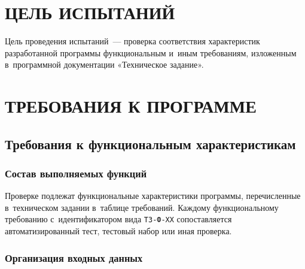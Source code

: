 \documentclass[12pt,a4paper]{extarticle}
\begin{document}
\clearpage

\section{ЦЕЛЬ ИСПЫТАНИЙ}

Цель проведения испытаний~--- проверка соответствия характеристик разработанной программы функциональным и~иным требованиям, изложенным в~программной документации «Техническое задание».

\clearpage

\section{ТРЕБОВАНИЯ К ПРОГРАММЕ}

\subsection{Требования к функциональным характеристикам}

\subsubsection{Состав выполняемых функций}


Проверке подлежат функциональные характеристики программы, перечисленные в~техническом задании в~таблице требований. Каждому функциональному требованию с~идентификатором вида \texttt{ТЗ-Ф-XX} сопоставляется автоматизированный тест, тестовый набор или иная проверка.



\clearpage

\subsubsection{Организация входных данных}
\end{document}
